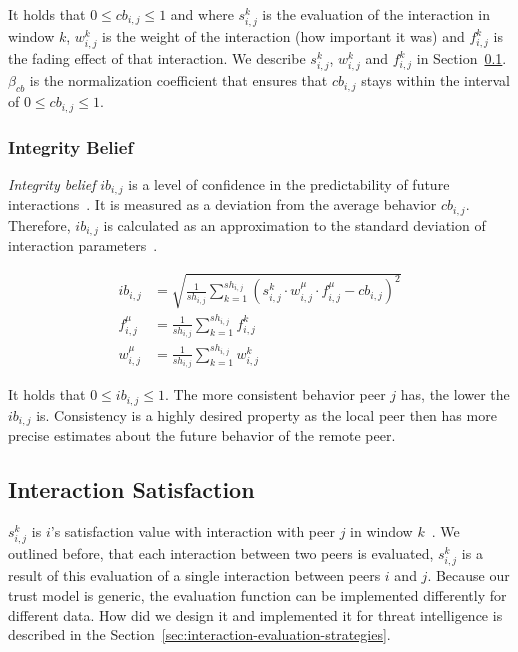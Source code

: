It holds that $0 \leq cb_{i,j} \leq 1$ and where $s^{k}_{i,j}$ is the evaluation of the interaction in window $k$, $w^{k}_{i, j}$ is the weight of the interaction (how important it was) and $f^{k}_{i,j}$ is the fading effect of that interaction. We describe $s^{k}_{i,j}$, $w^{k}_{i,j}$ and $f^{k}_{i,j}$ in Section~\ref{subsec:interaction-satisfaction}. 
$\beta_{cb}$ is the normalization coefficient that ensures that $cb_{i, j}$ stays within the interval of $0 \leq cb_{i,j} \leq 1$.

\subsubsection{Integrity Belief}
\textit{Integrity belief} $ib_{i,j}$ is a level of confidence in the predictability of future interactions~\cite{sort}. It is measured as a deviation from the average behavior $cb_{i,j}$.
Therefore, $ib_{i,j}$ is calculated as an approximation to the standard deviation of interaction parameters~\cite{sort}.

\begin{equation}
\begin{split}
    ib_{i,j} &= \sqrt{\frac{1}{sh_{i,j}} \sum_{k=1}^{sh_{i,j}}\left(s_{i,j}^{k} \cdot w_{i,j}^{\mu} \cdot f_{i,j}^{\mu} - cb_{i,j}\right)^{2}} \\
    f_{i,j}^{\mu} &= \frac{1}{sh_{i, j}} \sum_{k=1}^{sh_{i,j}} f^{k}_{i,j} \\
    w_{i,j}^{\mu} &= \frac{1}{sh_{i, j}} \sum_{k=1}^{sh_{i,j}} w^{k}_{i,j}
\end{split}
\end{equation}

It holds that $0 \leq ib_{i,j} \leq 1$.
The more consistent behavior peer $j$ has, the lower the $ib_{i,j}$ is. Consistency is a highly desired property as the local peer then has more precise estimates about the future behavior of the remote peer.

\subsection{Interaction Satisfaction}
\label{subsec:interaction-satisfaction}
$s^{k}_{i, j}$ is $i$'s satisfaction value with interaction with peer $j$ in window $k$~\cite{sort}.
We outlined before, that each interaction between two peers is evaluated, $s^{k}_{i, j}$ is a result of this evaluation of a single interaction between peers $i$ and $j$.
Because our trust model is generic, the evaluation function can be implemented differently for different data.
How did we design it and implemented it for threat intelligence is described in the Section~\ref{sec:interaction-evaluation-strategies}.

